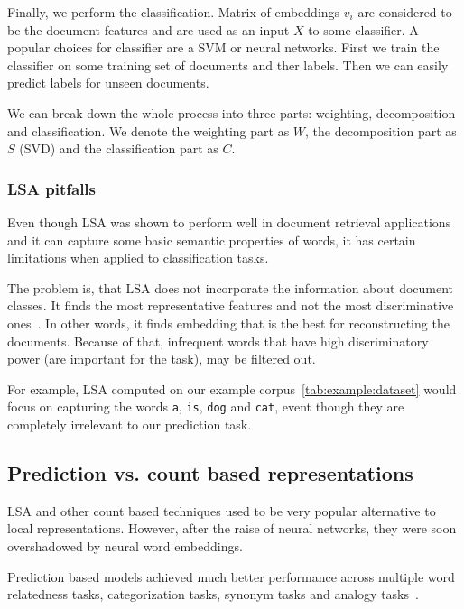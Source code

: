     Finally, we perform the classification.
    Matrix of embeddings $v_i$ are considered to be the document features and are used as an input $X$ to some classifier. 
    A popular choices for classifier are a SVM or neural networks.
    First we train the classifier on some training set of documents and ther labels.
    Then we can easily predict labels for unseen documents.
    
    We can break down the whole process into three parts: weighting, decomposition and classification.
    We denote the weighting part as $W$, the decomposition part as $S$ (SVD) and the classification part as $C$.
    
    \subsubsection{LSA pitfalls}

    Even though LSA was shown to perform well in document retrieval applications and it can capture some basic semantic properties of words,
    it has certain limitations when applied to classification tasks. 
    
    The problem is, that LSA does not incorporate the information about document classes. 
    It finds the most representative features and not the most discriminative ones~\cite{berry1995using}.
    In other words, it finds embedding that is the best for reconstructing the documents.
    Because of that, infrequent words that have high discriminatory power (are important for the task), may be filtered out.
    
    For example, LSA computed on our example corpus~\ref{tab:example:dataset} would focus on capturing the words \texttt{a}, \texttt{is}, \texttt{dog} and \texttt{cat},
    event though they are completely irrelevant to our prediction task.
    
    \subsection{Prediction vs. count based representations} \label{sec:count:vs:predict}
        
    LSA and other count based techniques used to be very popular alternative to local representations.
    However, after the raise of neural networks, they were soon overshadowed by neural word embeddings.
    
    Prediction based models achieved much better performance across multiple word relatedness tasks, categorization tasks, synonym tasks and analogy tasks~\cite{baroni2014don}. %
    
